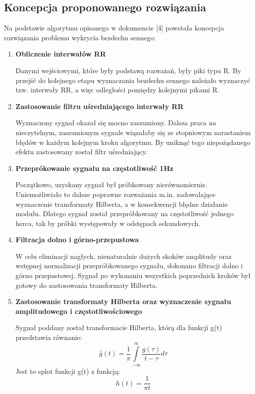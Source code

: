 \subsection{Koncepcja proponowanego rozwiązania}
Na podstawie algorytmu opisanego w dokumencie [4] powstała koncepcja rozwiązania problemu wykrycia bezdechu sennego:
\begin{enumerate}
 \item \textbf{Obliczenie interwałów RR}
 
 Danymi wejściowymi, które były podstawą rozważań, były piki typu R. By przejść do kolejnego etapu wyznaczania bezdechu sennego należało wyznaczyć tzw. interwały RR, a więc odległości pomiędzy kolejnymi pikami R.
 \item \textbf{Zastosowanie filtru uśredniającego interwały RR}
 
 Wyznaczony sygnał okazał się mocno zaszumiony. Dalsza praca na nieczytelnym, zaszumionym sygnale wiązałaby się ze stopniowym narastaniem błędów w każdym kolejnym kroku algorytmu. By uniknąć tego niepożądanego efektu zastosowany został filtr uśredniający.
 \item \textbf{Przeprókowanie sygnału na częstotliwość 1Hz}
 
 Początkowo, uzyskany sygnał był próbkowany nierównomiernie. Uniemożliwiało to dalsze poprawne rozważania m.in. zadowalające wyznaczenie transformaty Hilberta, a w konsekwencji błędne działanie modułu. Dlatego sygnał został przepróbkowany na częstotliwość jednego herca, tak by próbki występowały w odstępach sekundowych.
 \item \textbf{Filtracja dolno i górno-przepustowa}
 
 W celu eliminacji nagłych, nienaturalnie dużych skoków amplitudy oraz wstępnej normalizacji przepróbkowanego sygnału, dokonano filtracji dolno i górno przepustowej. Sygnał po wykonaniu wszystkich poprzednich kroków był gotowy do zastosowania transformaty Hilberta.
 \item \textbf{Zastosowanie transformaty Hilberta oraz wyznaczenie sygnału amplitudowego i częstotliwościowego}
 
 Sygnał poddany został transformacie Hilberta, którą dla funkcji g(t) przedstawia równanie:
 \begin{equation}
 \widehat{g}(t) = \frac{1}{\pi}\int\limits_{-\infty}^{\infty} \frac{g(\tau)}{t-\tau} d\tau
 \end{equation}
 Jest to splot funkcji g(t) z funkcją:
 \begin{equation}
 h(t) = \frac{1}{\pi t}
 \end{equation}
 

\end{enumerate}
